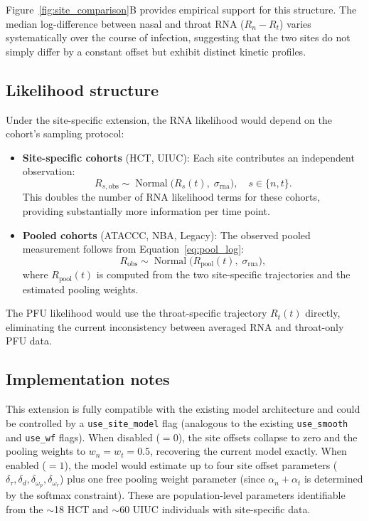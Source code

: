 \begin{appendix}
    Figure~\ref{fig:site_comparison}B provides empirical support for this structure. The median log-difference between nasal and throat RNA ($R_n - R_t$) varies systematically over the course of infection, suggesting that the two sites do not simply differ by a constant offset but exhibit distinct kinetic profiles.

    \subsection{Likelihood structure}

    Under the site-specific extension, the RNA likelihood would depend on the cohort's sampling protocol:
    \begin{itemize}
        \item \textbf{Site-specific cohorts} (HCT, UIUC): Each site contributes an independent observation:
        \begin{equation}
            R_{s,\text{obs}} \sim \operatorname{Normal}\!\bigl(R_s(t),\; \sigma_{\text{rna}}\bigr), \quad s \in \{n, t\}.
        \end{equation}
        This doubles the number of RNA likelihood terms for these cohorts, providing substantially more information per time point.
        \item \textbf{Pooled cohorts} (ATACCC, NBA, Legacy): The observed pooled measurement follows from Equation~\eqref{eq:pool_log}:
        \begin{equation}
            R_{\text{obs}} \sim \operatorname{Normal}\!\bigl(R_{\text{pool}}(t),\; \sigma_{\text{rna}}\bigr),
        \end{equation}
        where $R_{\text{pool}}(t)$ is computed from the two site-specific trajectories and the estimated pooling weights.
    \end{itemize}
    The PFU likelihood would use the throat-specific trajectory $R_t(t)$ directly, eliminating the current inconsistency between averaged RNA and throat-only PFU data.

    \subsection{Implementation notes}

    This extension is fully compatible with the existing model architecture and could be controlled by a \texttt{use\_site\_model} flag (analogous to the existing \texttt{use\_smooth} and \texttt{use\_wf} flags). When disabled ($= 0$), the site offsets collapse to zero and the pooling weights to $w_n = w_t = 0.5$, recovering the current model exactly. When enabled ($= 1$), the model would estimate up to four site offset parameters ($\delta_\tau, \delta_d, \delta_{\omega_p}, \delta_{\omega_r}$) plus one free pooling weight parameter (since $\alpha_n + \alpha_t$ is determined by the softmax constraint). These are population-level parameters identifiable from the $\sim$18 HCT and $\sim$60 UIUC individuals with site-specific data.


\end{appendix}
